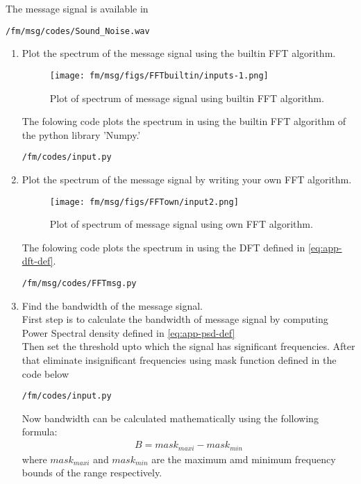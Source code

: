 The message signal is available in 
\begin{lstlisting}
/fm/msg/codes/Sound_Noise.wav
\end{lstlisting}
\begin{enumerate}[label=\arabic*.,ref=\thesection.\theenumi]
\item Plot the spectrum of the message signal using the builtin FFT algorithm.\\
	\solution		
\begin{figure}[H]
\centering
\texttt{[image: fm/msg/figs/FFTbuiltin/inputs-1.png]}
\caption{Plot of spectrum of message signal using builtin FFT algorithm.}
\label{fig:FFTb}
\end{figure}
The folowing code plots the spectrum in  using the builtin FFT algorithm of the python library 'Numpy.'
\begin{lstlisting}
/fm/codes/input.py
\end{lstlisting}

\item Plot the spectrum of the message signal by writing your own FFT algorithm.\\
	\solution
\begin{figure}[H]
\centering
\texttt{[image: fm/msg/figs/FFTown/input2.png]}
\caption{Plot of spectrum of message signal using own FFT algorithm.}
\label{fig:FFTo}
\end{figure}
The folowing code plots the spectrum in  using the DFT defined in  \eqref{eq:app-dft-def}.
\begin{lstlisting}
/fm/msg/codes/FFTmsg.py
\end{lstlisting}

\item Find the bandwidth of the message signal.\\
\solution First step is to calculate the bandwidth of message signal by computing Power Spectral density defined in \eqref{eq:app-psd-def} \\
Then set the threshold upto which the signal has significant frequencies.
After that eliminate insignificant frequencies using mask function defined in the code below\\
\begin{lstlisting}
/fm/codes/input.py
\end{lstlisting}
Now bandwidth can be calculated mathematically using the following formula:
\begin{align*}
B=mask_{maxi}-mask_{min}
\end{align*}
where $mask_{maxi}$ and $mask_{min} $ are the maximum amd minimum frequency bounds of the range  respectively.\\

\end{enumerate}
